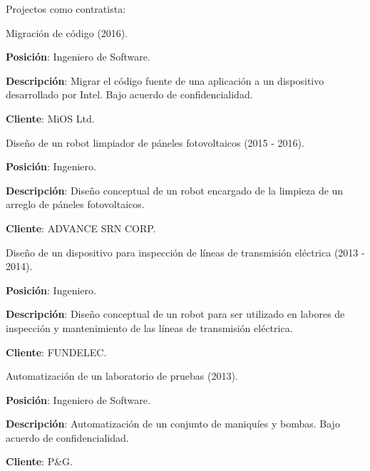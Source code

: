 \documentclass[10pt]{article}
\renewcommand{\section}[1]{\pagebreak[3]%
    \vspace{1.3\baselineskip}%
    \phantomsection\addcontentsline{toc}{section}{#1}%
    \noindent\llap{\scshape\smash{\parbox[t]{\marginparwidth}{\hyphenpenalty=10000\raggedright #1}}}%
    \vspace{-\baselineskip}\par}
\newcommand{\halfblankline}{\quad\vspace{-0.5\baselineskip}\pagebreak[3]}
\begin{document}
\halfblankline

Projectos como contratista:
\begin{innerlist}
\item Migración de código (2016).
  \begin{innerlist}
  \item \textbf{Posición}: Ingeniero de Software.
  \item \textbf{Descripción}: Migrar el código fuente de una aplicación a un
    dispositivo desarrollado por Intel. Bajo acuerdo de confidencialidad.
  \item \textbf{Cliente}: MiOS Ltd.
  \end{innerlist}
\item Diseño de un robot limpiador de páneles fotovoltaicos (2015 - 2016).
  \begin{innerlist}
  \item \textbf{Posición}: Ingeniero.
  \item \textbf{Descripción}: Diseño conceptual de un robot encargado de la
    limpieza de un arreglo de páneles fotovoltaicos.
  \item \textbf{Cliente}: ADVANCE SRN CORP.
  \end{innerlist}
\item Diseño de un dispositivo para inspección de líneas de
  transmisión eléctrica (2013 - 2014).
  \begin{innerlist}
  \item \textbf{Posición}: Ingeniero.
  \item \textbf{Descripción}: Diseño conceptual de un robot para ser utilizado
    en labores de inspección y mantenimiento de las líneas de transmisión eléctrica.
  \item \textbf{Cliente}: FUNDELEC.
  \end{innerlist}
\item Automatización de un laboratorio de pruebas (2013).
  \begin{innerlist}
  \item \textbf{Posición}: Ingeniero de Software.
  \item \textbf{Descripción}: Automatización de un conjunto de maniquíes y
    bombas. Bajo acuerdo de confidencialidad.
  \item \textbf{Cliente}: P\&G.
  \end{innerlist}
\end{innerlist}

%
\end{document}
